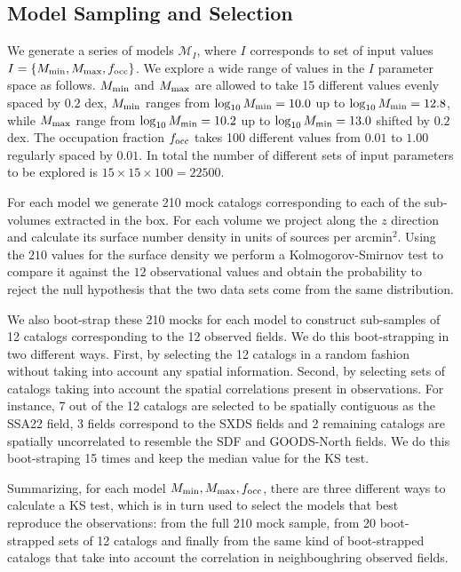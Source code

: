 \documentclass{emulateapj}
\begin{document}
\subsection{Model Sampling and Selection}
We generate a series of models ${\mathcal M}_{I}$, where $I$ corresponds to set of input values $I=\{M_{\rm min}, M_{\rm max}, f_{\rm occ}\}$. We explore a wide range of values in the $I$ parameter space as follows. $M_{\rm min}$ and $M_{\rm max}$ are allowed to take 15 different values evenly spaced by $0.2$ dex, $M_{\rm min}$ ranges from $\log_{10}M_{\rm min}=10.0$ up to $\log_{10}M_{\rm min}=12.8$, while $M_{\rm max}$ range  from $\log_{10}M_{\rm min}=10.2$ up to $\log_{10}M_{\rm min}=13.0$ shifted by $0.2$ dex. The occupation fraction $f_{\rm occ}$ takes 100 different values from $0.01$ to $1.00$ regularly spaced by $0.01$. In total the number of different sets of input parameters to be explored is $15\times 15\times 100 = 22500$.


For each model we generate 210 mock catalogs corresponding to each of the sub-volumes extracted in the box. For each volume we project along the $z$ direction and calculate its surface number density in units of sources per arcmin$^{2}$. Using the $210$ values for the surface density we perform a Kolmogorov-Smirnov test to compare it against the $12$ observational values and obtain the probability to reject the null hypothesis that the two data sets come from the same distribution. 


We also boot-strap these 210 mocks for each model to construct sub-samples of 12 catalogs corresponding to the 12 observed fields. We do this boot-strapping in two different ways. First, by selecting the 12 catalogs in a random fashion without taking into account any spatial information. Second, by selecting sets of catalogs taking into account the spatial correlations present in observations. For instance, 7 out of the 12 catalogs are selected to be spatially contiguous as the SSA22 field, 3 fields correspond to the SXDS fields and 2 remaining catalogs are spatially uncorrelated to resemble the SDF and GOODS-North fields. We do this boot-straping 15 times and keep the median value for the KS test.

Summarizing, for each model $M_{\rm min}, M_{\rm max}, f_{\rm occ}$, there are three different ways to calculate a KS test, which is in turn used to select the models that best reproduce the observations: from the full 210 mock sample, from 20 boot-strapped sets of 12 catalogs and finally from the same kind of boot-strapped catalogs that take into account the correlation in neighboughring observed fields.
\end{document}
